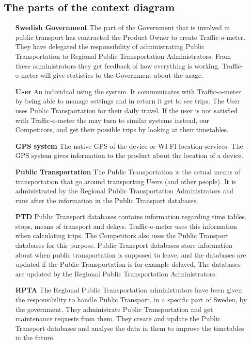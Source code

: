 \documentclass[a4paper]{article}
\begin{document}
	\subsection{The parts of the context diagram}			
		\begin{itemize}

			\item[\textbf{Swedish Government}] The part of the Government that is involved in public transport has contracted the Product Owner to create Traffic-o-meter. They have delegated the responsibility of administrating Public Transportation to Regional Public Transportation Administrators. From these administrators they get feedback of how everything is working. Traffic-o-meter will give statistics to the Government about the usage.
			\item[\textbf{User}] An individual using the system. It communicates with Traffic-o-meter by being able to manage settings and in return it get to see trips. The User uses Public Transportation for their daily travel. If the user is not satisfied with Traffic-o-meter the may turn to similar systems instead, our Competitors, and get their possible trips by looking at their timetables.
			\item[\textbf{GPS system}] The native GPS of the device or WI-FI location services. The GPS system gives information to the product about the location of a device.
			\item[\textbf{Public Transportation}] The Public Transportation is the actual means of transportation that go around transporting Users (and other people). It is administrated by the Regional Public Transportation Administrators and runs after the information in the Public Transport databases.
			\item[\textbf{PTD}] Public Transport databases contains information regarding time tables, stops, means of transport and delays. Traffic-o-meter uses this information when calculating trips. The Competitors also uses the Public Transport databases for this purpose. Public Transport databases store information about when public transportation is supposed to leave, and the databases are updated if the Public Transportation is for example delayed. The databases are updated by the Regional Public Transportation Administrators.
			\item[\textbf{RPTA}] The Regional Public Transportation administrators have been given the responsibility to handle Public Transport, in a specific part of Sweden, by the government. They administrate Public Transportation and get maintenance requests from them. They create and update the Public Transport databases and analyse the data in them to improve the timetables in the future.
			

\end{itemize}
\end{document}
